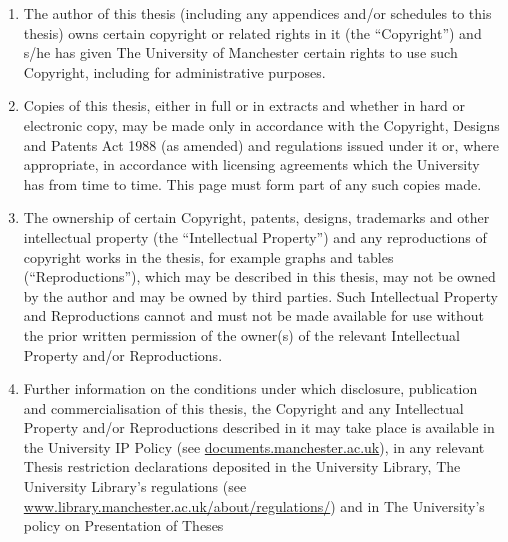    \begin{copyrightstatement}
    
    \addchaptertocentry{\copyrightname} %
    
    \begin{enumerate}[label=(\roman*)]
    \item The author of this thesis (including any appendices and/or
    schedules to this thesis) owns certain copyright or related rights
    in it (the ``Copyright'') and s/he has given The University of
    Manchester certain rights to use such Copyright, including for
    administrative purposes.\\[0.3cm]
    \item Copies of this thesis, either in full or in extracts and whether in
    hard or electronic copy, may be made {\bcf only} in accordance with the
    Copyright, Designs and Patents Act 1988 (as amended) and
    regulations issued under it or, where appropriate, in accordance
    with licensing agreements which the University has from time to
    time. This page must form part of any such copies made.\\[0.3cm]
    \item The ownership of certain Copyright, patents, designs, trademarks
    and other intellectual property (the ``Intellectual Property'') and
    any reproductions of copyright works in the thesis, for example
    graphs and tables (``Reproductions''), which may be described in
    this thesis, may not be owned by the author and may be owned
    by third parties. Such Intellectual Property and Reproductions
    cannot and must not be made available for use without the prior
    written permission of the owner(s) of the relevant Intellectual
    Property and/or Reproductions.\\[0.3cm]
    \item Further information on the conditions under which disclosure,
    publication and commercialisation of this thesis, the Copyright
    and any Intellectual Property and/or Reproductions described in
    it may take place is available in the University IP Policy (see
    \href{http://documents.manchester.ac.uk/DocuInfo.aspx?DocID=2442
    0}{documents.manchester.ac.uk}), in any relevant Thesis restriction declarations deposited in the
    University Library, The University Library’s regulations (see
    \href{http://www.library.manchester.ac.uk/about/regulations/}{www.library.manchester.ac.uk/about/regulations/}) and in
    The University’s policy on Presentation of Theses
    \end{enumerate}
    \end{copyrightstatement}
    
    
